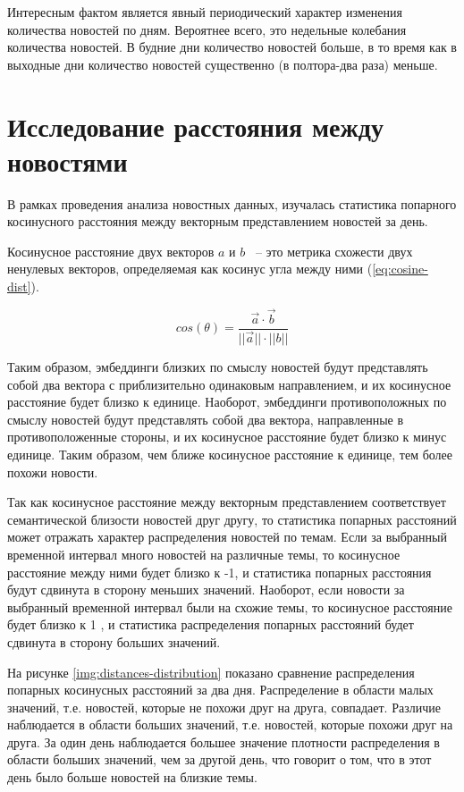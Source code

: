 Интересным фактом является явный периодический характер изменения количества новостей по дням. Вероятнее всего, это недельные колебания количества новостей. В будние дни количество новостей больше, в то время как в выходные дни количество новостей существенно (в полтора-два раза) меньше.

\section{Исследование расстояния между новостями}

В рамках проведения анализа новостных данных, изучалась статистика попарного косинусного расстояния между векторным представлением новостей за день.

Косинусное расстояние двух векторов $a$ и $b$ ~-- это метрика схожести двух ненулевых векторов, определяемая как косинус угла между ними (\ref{eq:cosine-dist}).

\begin{equation}
    cos(\theta) = \frac{\vec{a} \cdot \vec{b}}{||\vec{a}|| \cdot ||{b}||}
    \label{eq:cosine-dist}
\end{equation}

Таким образом, эмбеддинги близких по смыслу новостей будут представлять собой два вектора с приблизительно одинаковым направлением, и их косинусное расстояние будет близко к единице. Наоборот, эмбеддинги противоположных по смыслу новостей будут представлять собой два вектора, направленные в противоположенные стороны, и их косинусное расстояние будет близко к минус единице. Таким образом, чем ближе косинусное расстояние к единице, тем более похожи новости.

Так как косинусное расстояние между векторным представлением соответствует семантической близости новостей друг другу, то статистика попарных расстояний может отражать характер распределения новостей по темам. Если за выбранный временной интервал много новостей на различные темы, то косинусное расстояние между ними будет близко к -1, и статистика попарных расстояния будут сдвинута в сторону меньших значений. Наоборот, если новости за выбранный временной интервал были на схожие темы, то косинусное расстояние будет близко к 1 , и статистика распределения попарных расстояний будет сдвинута в сторону больших значений.

На рисунке \ref{img:distances-distribution} показано сравнение распределения попарных косинусных расстояний за два дня. Распределение в области малых значений, т.е. новостей, которые не похожи друг на друга, совпадает. Различие наблюдается в области больших значений, т.е. новостей, которые похожи друг на друга. За один день наблюдается большее значение плотности распределения в области больших значений, чем за другой день, что говорит о том, что в этот день было больше новостей на близкие темы.


